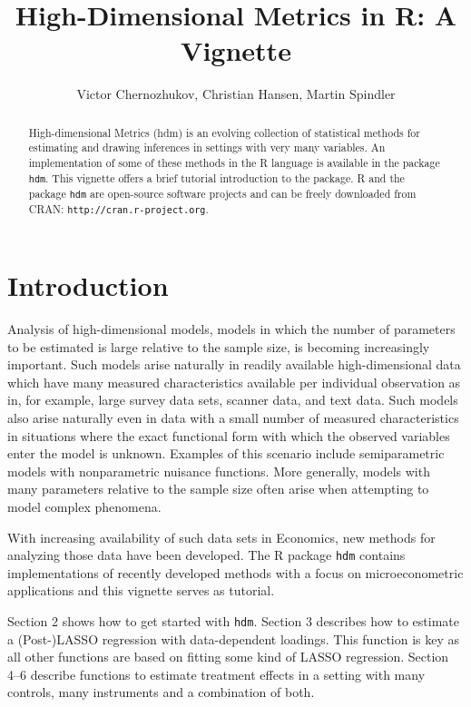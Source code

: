 \documentclass{amsart}
\title{High-Dimensional Metrics in R: A Vignette}
\author{Victor Chernozhukov, Christian Hansen, Martin Spindler}
\newcommand{\Rpackage}[1]{{\texttt{#1}}}
\newcommand{\R}{{\normalfont\textsf{R }}{}}
\begin{document}



\begin{abstract}
High-dimensional Metrics (hdm) is an evolving collection of statistical
methods for estimating and drawing inferences in settings with very many variables. An implementation of some of these methods in the \R language is available in the package \Rpackage{hdm}.
This vignette offers a brief tutorial introduction to
the package.  \R and the package \Rpackage{hdm} are open-source
software projects and can be freely downloaded from CRAN:
\texttt{http://cran.r-project.org}.
\end{abstract}

\maketitle

\pagestyle{myheadings}



\section{Introduction}
Analysis of high-dimensional models, models in which the number of parameters to be estimated is large relative to the sample size, is becoming increasingly important.  Such models arise naturally in readily available high-dimensional data which have many measured characteristics available per individual observation as in, for example, large survey data sets, scanner data, and text data.  Such models also arise naturally even in data with a small number of measured characteristics in situations where the exact functional form with which the observed variables enter the model is unknown.  Examples of this scenario include semiparametric models with nonparametric nuisance functions.  More generally, models with many parameters relative to the sample size often arise when attempting to model complex phenomena.

With increasing availability of such data sets in Economics, new methods for analyzing those data have been developed. The \R package \Rpackage{hdm} contains implementations of recently developed methods with a focus on microeconometric applications and this vignette serves as tutorial.

Section 2 shows how to get started with \Rpackage{hdm}. Section 3 describes how to estimate a (Post-)LASSO regression with data-dependent loadings. This function is key as all other functions are based on fitting some kind of LASSO regression. Section 4--6 describe functions to estimate treatment effects in a setting with many controls, many instruments and a combination of both. 
\end{document}
